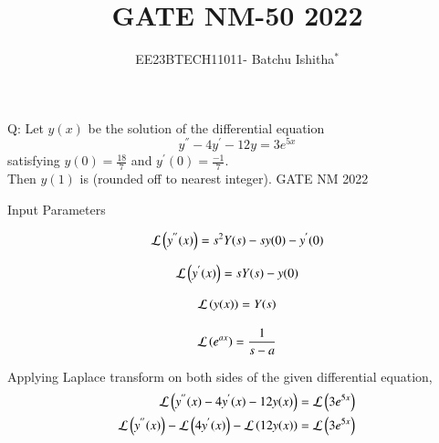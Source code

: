 \documentclass[journal,12pt,onecolumn]{IEEEtran}
\theoremstyle{remark}
\begin{document}
\let\vec\mathbf



\title{ GATE NM-50 2022}
\author{EE23BTECH11011- Batchu Ishitha$^{*}$%
}
\maketitle




\bigskip

\renewcommand{\thefigure}{\theenumi}
\renewcommand{\thetable}{\theenumi}

Q:  Let $y(x)$ be the solution of the differential equation 
$$y^{''} - 4y^{'} -12y = 3e^{5x}$$
satisfying $y(0)=\frac{18}{7}$ and $y^{'}(0)=\frac{-1}{7}$. \\
Then $y(1)$ is \underline{\hspace{2.5cm}}  (rounded off to nearest integer).      \hfill{GATE NM 2022 }

\solution
\begin{table}[!ht]    
    \centering
    
    \caption{Input Parameters}
    \label{table:ishitha.g22.nm.50.t1}
\end{table}

\begin{equation}
\mathcal{L}\left(y^{''}(x)\right) = s^{2}Y(s)-sy(0)-y^{'}(0) \\ \label{eq:ishitha.g22.nm.50.1.eq}
\end{equation}

\begin{equation}
\mathcal{L}\left(y^{'}(x)\right)  = sY(s)-y(0) \\ \label{eq:ishitha.g22.nm.50.2.eq}
\end{equation}

\begin{equation}
\mathcal{L}\left(y(x)\right)      = Y(s) \\ \label{eq:ishitha.g22.nm.50.3.eq}
\end{equation}

\begin{equation}
\mathcal{L}\left(e^{ax}\right)    = \frac{1}{s-a} \\ \label{eq:ishitha.g22.nm.50.4.eq}
\end{equation}

Applying Laplace transform on both sides of the given differential equation,
\begin{align}
\mathcal{L}\left(y^{''}(x) - 4y^{'}(x) -12y(x)\right)&=\mathcal{L}\left(3e^{5x}\right)\\
\mathcal{L}\left(y^{''}(x)\right) - \mathcal{L}\left(4y^{'}(x)\right) - \mathcal{L}\left(12y(x)\right) &= \mathcal{L}\left(3e^{5x}\right)
\end{align}
\end{document}
